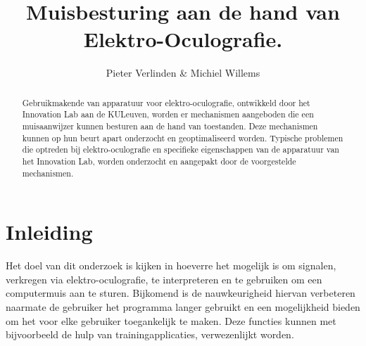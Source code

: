 \documentclass{article}
\title{Muisbesturing aan de hand van Elektro-Oculografie.}
\author{Pieter Verlinden \& Michiel Willems}
\begin{document}
\maketitle

\begin{abstract}
  Gebruikmakende van apparatuur voor elektro-oculografie, ontwikkeld door het Innovation Lab aan de KULeuven, worden er mechanismen aangeboden die een muisaanwijzer kunnen besturen aan de hand van toestanden. Deze mechanismen kunnen op hun beurt apart onderzocht en geoptimaliseerd worden. Typische problemen die optreden bij elektro-oculografie en specifieke eigenschappen van de apparatuur van het Innovation Lab, worden onderzocht en aangepakt door de voorgestelde mechanismen.
\end{abstract}

\section{Inleiding}
Het doel van dit onderzoek is kijken in hoeverre het mogelijk is om signalen, verkregen via elektro-oculografie, te interpreteren en te gebruiken om een computermuis aan te sturen. Bijkomend is de nauwkeurigheid hiervan verbeteren naarmate de gebruiker het programma langer gebruikt en een mogelijkheid bieden om het voor elke gebruiker toegankelijk te maken. Deze functies kunnen met bijvoorbeeld de hulp van trainingapplicaties, verwezenlijkt worden. 
\end{document}
